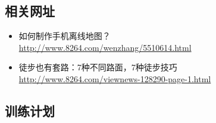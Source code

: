 \subsection{相关网址}
\begin{itemize}
  \item 如何制作手机离线地图？\\
   \url{http://www.8264.com/wenzhang/5510614.html}
  \item 徒步也有套路：7种不同路面，7种徒步技巧\\
    \url{http://www.8264.com/viewnews-128290-page-1.html}
\end{itemize}
\subsection{训练计划}